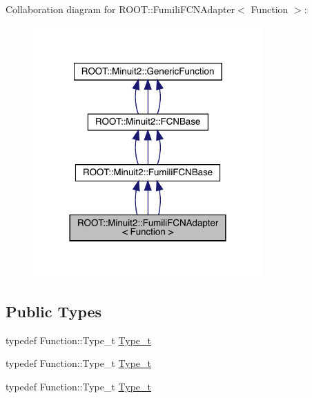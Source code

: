 Collaboration diagram for R\+O\+OT\+:\+:Fumili\+F\+C\+N\+Adapter$<$ Function $>$\+:
\nopagebreak
\begin{figure}[H]
\begin{center}
\leavevmode
\includegraphics[width=249pt]{de/d14/classROOT_1_1Minuit2_1_1FumiliFCNAdapter__coll__graph}
\end{center}
\end{figure}
\subsection*{Public Types}
\begin{DoxyCompactItemize}
\item 
typedef Function\+::\+Type\+\_\+t \mbox{\hyperlink{classROOT_1_1Minuit2_1_1FumiliFCNAdapter_afce33892c378fb82c3209eda03824e11}{Type\+\_\+t}}
\item 
typedef Function\+::\+Type\+\_\+t \mbox{\hyperlink{classROOT_1_1Minuit2_1_1FumiliFCNAdapter_afce33892c378fb82c3209eda03824e11}{Type\+\_\+t}}
\item 
typedef Function\+::\+Type\+\_\+t \mbox{\hyperlink{classROOT_1_1Minuit2_1_1FumiliFCNAdapter_afce33892c378fb82c3209eda03824e11}{Type\+\_\+t}}
\end{DoxyCompactItemize}
